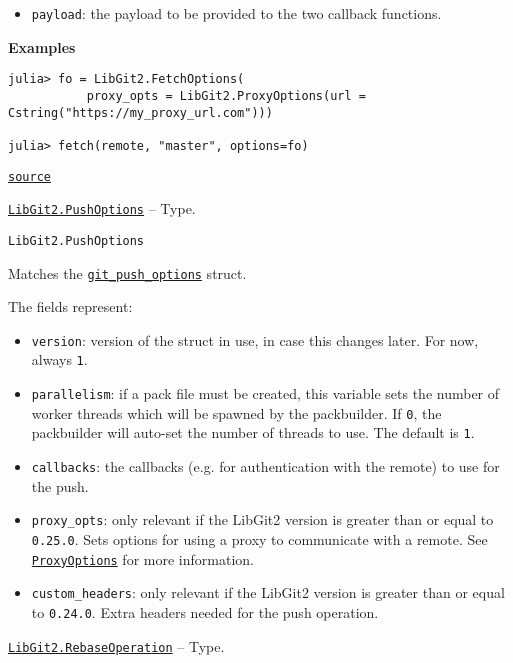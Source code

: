 \begin{adjustwidth}{2em}{0pt}
\begin{itemize}
\item \texttt{payload}: the payload to be provided to the two callback functions.

\end{itemize}
\textbf{Examples}


\begin{verbatim}
julia> fo = LibGit2.FetchOptions(
           proxy_opts = LibGit2.ProxyOptions(url = Cstring("https://my_proxy_url.com")))

julia> fetch(remote, "master", options=fo)
\end{verbatim}



\href{https://github.com/JuliaLang/julia/blob/44fa15b1502a45eac76c9017af94332d4557b251/base/#L0-L32}{\texttt{source}}


\end{adjustwidth}
\hypertarget{13899785564428555533}{} 
\hyperlink{13899785564428555533}{\texttt{LibGit2.PushOptions}}  -- {Type.}

\begin{adjustwidth}{2em}{0pt}


\begin{verbatim}
LibGit2.PushOptions
\end{verbatim}

Matches the \href{https://libgit2.org/libgit2/\#HEAD/type/git\_push\_options}{\texttt{git\_push\_options}} struct.

The fields represent:

\begin{itemize}
\item \texttt{version}: version of the struct in use, in case this changes later. For now, always \texttt{1}.


\item \texttt{parallelism}: if a pack file must be created, this variable sets the number of worker  threads which will be spawned by the packbuilder. If \texttt{0}, the packbuilder will auto-set  the number of threads to use. The default is \texttt{1}.


\item \texttt{callbacks}: the callbacks (e.g. for authentication with the remote) to use for the push.


\item \texttt{proxy\_opts}: only relevant if the LibGit2 version is greater than or equal to \texttt{0.25.0}.  Sets options for using a proxy to communicate with a remote. See \hyperlink{1179613637206861638}{\texttt{ProxyOptions}}  for more information.


\item \texttt{custom\_headers}: only relevant if the LibGit2 version is greater than or equal to \texttt{0.24.0}.  Extra headers needed for the push operation.

\end{itemize}


\end{adjustwidth}
\hypertarget{4600807719307889860}{} 
\hyperlink{4600807719307889860}{\texttt{LibGit2.RebaseOperation}}  -- {Type.}


